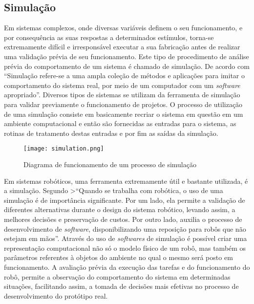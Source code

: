 \subsection{Simulação}\label{sec:simula}
Em sistemas complexos, onde diversas variáveis definem o seu funcionamento, e por consequência as suas respostas a determinados estímulos, torna-se extremamente difícil e irresponsável executar a sua fabricação antes de realizar uma validação prévia de seu funcionamento.
Este tipo de procedimento de análise prévia do comportamento de um sistema é chamado de simulação. De acordo com \cite{definição_de_simulação} “Simulação refere-se a uma ampla coleção de métodos e aplicações para imitar o comportamento do sistema real, por meio de um computador com um \textit{software} apropriado”. Diversos tipos de sistemas se utilizam da ferramenta de simulação para validar previamente o funcionamento de projetos.
O processo de utilização de uma simulação consiste em basicamente recriar o sistema em questão em um ambiente computacional e então são fornecidas as entradas para o sistema, as rotinas de tratamento destas entradas e por fim as saídas da simulação.

\begin{figure}[h!]												
	\centering												
	\texttt{[image: simulation.png]}			
	\caption{Diagrama de funcionamento de um processo de simulação}		
	\label{img:simulation}	
\end{figure}


Em sistemas robóticos, uma ferramenta extremamente útil e bastante utilizada, é a simulação. Segundo \cite{artigo_sobre_simulação} 
>“Quando se trabalha com robótica, o uso de uma simulação é de importância significante. Por um lado, ela permite a validação de diferentes alternativas durante o design do sistema robótico, levando assim, a melhores decisões e preservação de custos. Por outro lado, auxilia o processo de desenvolvimento de \textit{software}, disponibilizando uma reposição para robôs que não estejam em mãos”.
Através do uso de \textit{softwares} de simulação é possível criar uma representação computacional não só o modelo físico de um robô, mas também os parâmetros referentes à objetos do ambiente no qual o mesmo será posto em funcionamento. A avaliação prévia da execução das tarefas e do funcionamento do robô, permite a observação do comportamento do sistema em determinadas situações, facilitando assim, a tomada de decisões mais efetivas no processo de desenvolvimento do protótipo real. 

